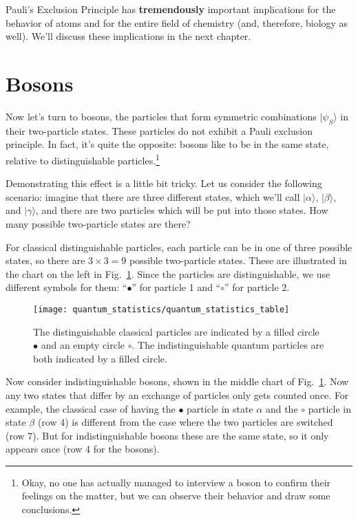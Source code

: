 Pauli's Exclusion Principle has {\bf tremendously} important implications
for the behavior of atoms and for the entire field of chemistry (and,
therefore, biology as well). We'll discuss these implications in the
next chapter.

\section{Bosons}

Now let's turn to bosons, the particles that form symmetric
combinations $|\psi_S\rangle$ in their two-particle states.  These
particles do not exhibit a Pauli exclusion principle.  In fact, it's
quite the opposite: bosons like to be in the same state, relative to
distinguishable particles.\footnote{Okay, no one has actually managed
  to interview a boson to confirm their feelings on the matter, but we
  can observe their behavior and draw some conclusions.}

Demonstrating this effect is a little bit tricky.  Let us consider the
following scenario: imagine that there are three different states,
which we'll call $|\alpha\rangle$, $|\beta\rangle$, and
$|\gamma\rangle$, and there are two particles which will be put into
those states.  How many possible two-particle states are there?

For classical distinguishable particles, each particle can be in one
of three possible states, so there are $3\times 3=9$ possible
two-particle states.  These are illustrated in the chart on the left
in Fig.~\ref{fig:quantum_statistics}.  Since the particles are
distinguishable, we use different symbols for them: ``$\bullet$''
for particle 1 and ``$\circ$'' for particle 2.

\begin{figure}[h]
\begin{center}
\texttt{[image: quantum\_statistics/quantum\_statistics\_table]}
\caption{The distinguishable classical particles are indicated by a
  filled circle $\bullet$ and an empty circle $\circ$.  The
  indistinguishable quantum particles are both indicated by a filled
  circle.}
\label{fig:quantum_statistics}
\end{center}
\end{figure}

Now consider indistinguishable bosons, shown in the middle chart of
Fig.~\ref{fig:quantum_statistics}.  Now any two states that differ by
an exchange of particles only gets counted once.  For example, the
classical case of having the $\bullet$ particle in state $\alpha$ and
the $\circ$ particle in state $\beta$ (row 4) is different from the
case where the two particles are switched (row 7).  But for
indistinguishable bosons these are the same state, so it only appears
once (row 4 for the bosons).

